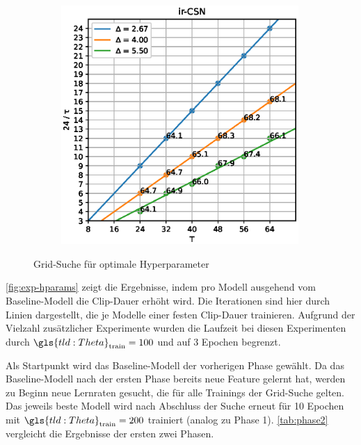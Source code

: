 \begin{figure}
\begin{subfigure}{.33\textwidth}
    \end{subfigure}
    \begin{subfigure}{.33\textwidth}
        \centering
        \includegraphics[width=0.99\textwidth, keepaspectratio, interpolate]{img/07_grid_csn.eps}
    \end{subfigure}
    \caption{Grid-Suche für optimale Hyperparameter}
    \label{fig:exp-hparams}
\end{figure}

\autoref{fig:exp-hparams} zeigt die Ergebnisse, indem pro Modell ausgehend vom Baseline-Modell die Clip-Dauer erhöht wird.
Die Iterationen sind hier durch Linien dargestellt, die je Modelle einer festen Clip-Dauer trainieren.
Aufgrund der Vielzahl zusätzlicher Experimente wurden die Laufzeit bei diesen Experimenten durch $\gls{tld:Theta}_\text{train} = 100$ und auf 3 Epochen begrenzt.

Als Startpunkt wird das Baseline-Modell der vorherigen Phase gewählt.
Da das Baseline-Modell nach der ersten Phase bereits neue Feature gelernt hat, werden zu Beginn neue Lernraten gesucht, die für alle Trainings der Grid-Suche gelten.
Das jeweils beste Modell wird nach Abschluss der Suche erneut für 10 Epochen mit $\gls{tld:Theta}_\text{train} = 200$ trainiert (analog zu Phase 1).
\autoref{tab:phase2} vergleicht die Ergebnisse der ersten zwei Phasen.

